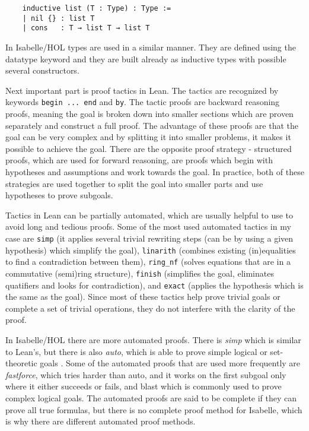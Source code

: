 \begin{lstlisting}
    inductive list (T : Type) : Type :=
    | nil {} : list T
    | cons   : T → list T → list T
\end{lstlisting}

In Isabelle/HOL types are used in a similar manner. They are defined using the datatype keyword and they are built already as inductive types with possible several constructors.


Next important part is proof tactics in Lean. The tactics are recognized by keywords \lstinline{begin ... end} and \lstinline{by}. The tactic proofs are backward reasoning proofs, meaning the goal is broken down into smaller sections which are proven separately and construct a full proof. The advantage of these proofs are that the goal can be very complex and by splitting it into smaller problems, it makes it possible to achieve the goal. There are the opposite proof strategy - structured proofs, which are used for forward reasoning, are proofs which begin with hypotheses and assumptions and work towards the goal. In practice, both of these strategies are used together to split the goal into smaller parts and use hypotheses to prove subgoals.

Tactics in Lean can be partially automated, which are usually helpful to use to avoid long and tedious proofs. Some of the most used automated tactics in my case are \lstinline{simp} (it applies several trivial rewriting steps (can be by using a given hypothesis) which simplify the goal), \lstinline{linarith} (combines existing (in)equalities to find a contradiction between them), \lstinline{ring_nf} (solves equations that are in a commutative (semi)ring structure), \lstinline{finish} (simplifies the goal, eliminates quatifiers and looks for contradiction), and \lstinline{exact} (applies the hypothesis which is the same as the goal). Since most of these tactics help prove trivial goals or complete a set of trivial operations, they do not interfere with the clarity of the proof.

In Isabelle/HOL there are more automated proofs. There is \emph{simp} which is similar to Lean's, but there is also \emph{auto}, which is able to prove simple logical or set-theoretic goals \cite{isabelle}. Some of the automated proofs that are used more frequently are \emph{fastforce}, which tries harder than auto, and it works on the first subgoal only where it either succeeds or fails, and blast which is commonly used to prove complex logical goals. The automated proofs are said to be complete if they can prove all true formulas, but there is no complete proof method for Isabelle, which is why there are different automated proof methods.
